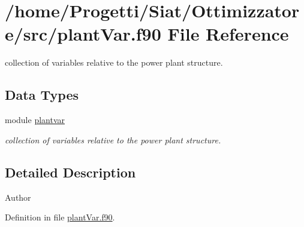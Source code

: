 \hypertarget{plant_var_8f90}{\section{/home/\-Progetti/\-Siat/\-Ottimizzatore/src/plant\-Var.f90 File Reference}
\label{plant_var_8f90}
}


collection of variables relative to the power plant structure.  


\subsection*{Data Types}
\begin{DoxyCompactItemize}
\item 
module \hyperlink{classplantvar}{plantvar}
\begin{DoxyCompactList}\small\item\em collection of variables relative to the power plant structure. \end{DoxyCompactList}\end{DoxyCompactItemize}


\subsection{Detailed Description}
\begin{DoxyAuthor}{Author}

\end{DoxyAuthor}


Definition in file \hyperlink{plant_var_8f90_source}{plant\-Var.\-f90}.

